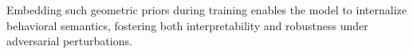 Embedding such geometric priors during training enables the model to internalize behavioral semantics, fostering both interpretability and robustness under adversarial perturbations.

